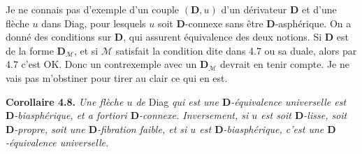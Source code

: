 \documentclass[11pt]{article}
\newcommand{\msp}[1]{\marginpar{\footnotesize [#1]}}
\newcommand{\D}{\mathbf{D}}
\begin{document}
Je ne connais pas d'exemple d'un couple $(\D, u)$ d'un dérivateur $\D$ et d'une flèche $u$ dans Diag, pour lesquels $u$ soit $\D$-connexe sans être $\D$-asphérique. On a donné des conditions sur $\D$, qui assurent équivalence des deux notions. Si $\D$ est de la forme $\D_{\mathcal{M}}$, et si $\mathcal{M}$ satisfait la condition dite dans 4.7 ou sa duale, alors par 4.7 c'est OK. Donc un contrexemple avec un $\D_{\mathcal{M}}$ devrait en tenir compte. Je ne vais pas m'obstiner pour tirer au clair ce qui en est.

\msp{page 65}

\textbf{Corollaire 4.8.} \textit{Une flèche $u$ de} Diag \textit{qui est une $\D$-équivalence universelle est $\D$-biasphérique, et \textup{a fortiori} $\D$-connexe. Inversement, si $u$ est soit $\D$-lisse, soit $\D$-propre, soit une $\D$-fibration faible, et si $u$ est $\D$-biasphérique, c'est une $\D$-équivalence universelle.}
\end{document}

